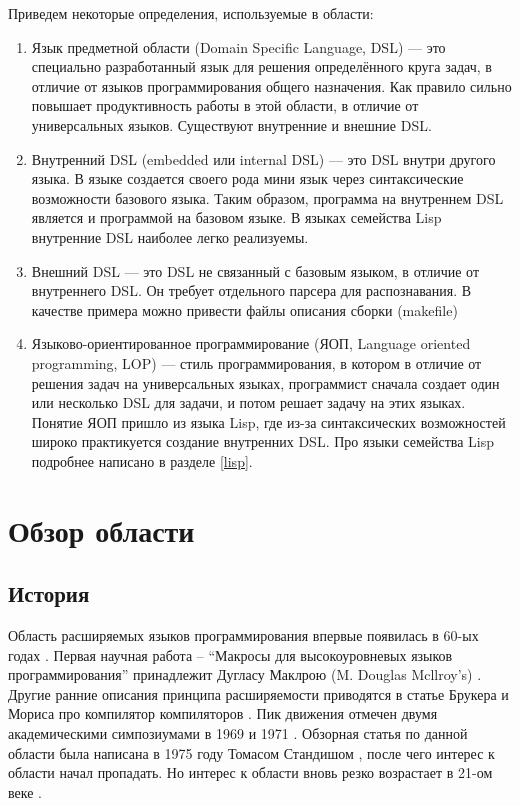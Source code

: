 \documentclass[a4paper,12pt]{article}
\begin{document}
Приведем некоторые определения, используемые в области:
\begin{enumerate}
  \item Язык предметной области (Domain Specific Language, DSL) --- это
  специально разработанный язык для решения определённого круга задач, в
  отличие от языков программирования общего назначения. Как правило
  сильно повышает продуктивность работы в этой области, в отличие от
  универсальных языков. Существуют внутренние и внешние DSL.
  \item Внутренний DSL (embedded или internal DSL) --- это DSL внутри другого
  языка. В языке создается своего рода мини язык через синтаксические
  возможности базового языка. Таким образом, программа на внутреннем DSL
  является и программой на базовом языке. В языках семейства Lisp внутренние
  DSL наиболее легко реализуемы.
  \item Внешний DSL --- это DSL не связанный с базовым языком, в отличие от
  внутреннего DSL. Он требует отдельного парсера для распознавания. В качестве
  примера можно привести файлы описания сборки (makefile)
  \item Языково-ориентированное программирование (ЯОП, Language oriented
  programming, LOP) --- стиль программирования, в котором в отличие от решения
  задач на универсальных языках, программист сначала создает один или несколько
  DSL для задачи, и потом решает задачу на этих языках. Понятие ЯОП пришло из
  языка Lisp, где из-за синтаксических возможностей широко практикуется
  создание внутренних DSL. Про языки семейства Lisp подробнее написано в
  разделе \ref{lisp}.
\end{enumerate}

\section{Обзор области}

\subsection{История}
\label{hist}
Область расширяемых языков программирования впервые появилась в 60-ых годах
\cite{hist69}. Первая научная работа -- ``Макросы для высокоуровневых языков
программирования'' принадлежит Дугласу Маклрою (M. Douglas Mcllroy's)
\cite{macro60}. Другие ранние описания принципа расширяемости приводятся в
статье Брукера и Мориса про компилятор компиляторов \cite{cc60}.
Пик движения отмечен двумя академическими симпозиумами в 1969 \cite{proc69} и 1971
\cite{proc71}. Обзорная статья по данной области была написана в 1975 году
Томасом Стандишом \cite{Stan75}, после чего интерес к области начал пропадать.
Но интерес к области вновь резко возрастает в 21-ом веке \cite{Ext2105}.
\end{document}
